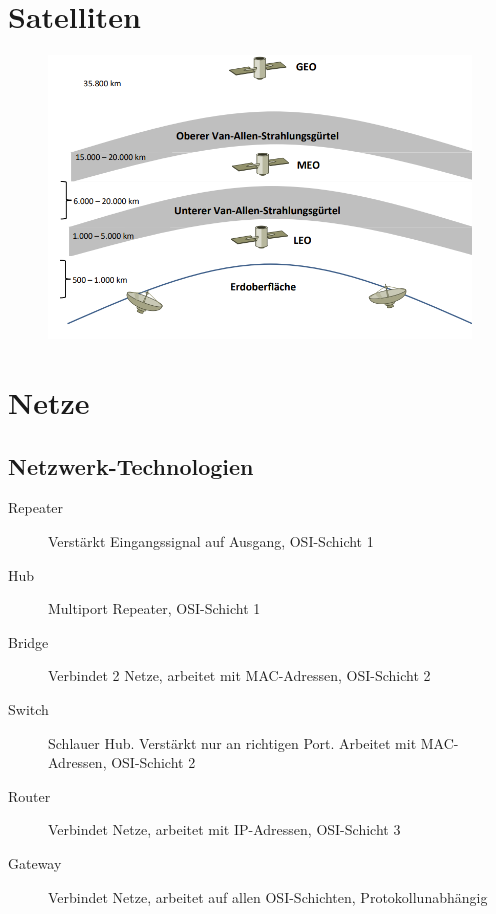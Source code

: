 \documentclass[12pt,a4paper]{article}
\begin{document}
	\section{Satelliten}
	\begin{center}
		\begin{figure}[!h]
			\includegraphics[width=\textwidth]{Bilder/Satelliten.png}
		\end{figure}
	\end{center}

	\section{Netze}
		\subsection{Netzwerk-Technologien}
			\begin{description}
				\item[Repeater] Verstärkt Eingangssignal auf Ausgang, OSI-Schicht 1
				\item[Hub] Multiport Repeater, OSI-Schicht 1
				\item[Bridge] Verbindet 2 Netze, arbeitet mit MAC-Adressen, OSI-Schicht 2 
				\item[Switch] Schlauer Hub. Verstärkt nur an richtigen Port. Arbeitet mit MAC-Adressen, OSI-Schicht 2 
				\item[Router] Verbindet Netze, arbeitet mit IP-Adressen, OSI-Schicht 3
				\item[Gateway] Verbindet Netze, arbeitet auf allen OSI-Schichten, Protokollunabhängig 
			\end{description}
\end{document}

